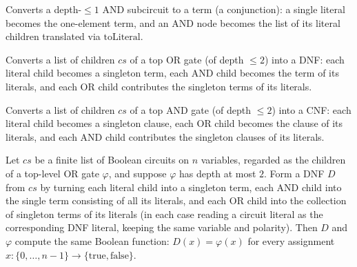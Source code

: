 \begin{definition}
\label{LMN.depth1AndToTerm}
\leanok
{}
Converts a depth-$\le 1$ AND subcircuit to a term (a conjunction): a single literal becomes
the one-element term, and an AND node becomes the list of its literal children translated
via $\mathrm{toLiteral}$.
\end{definition}

\begin{definition}
\label{LMN.depth2OrToDNF}
\leanok
{}
Converts a list of children $cs$ of a top OR gate (of depth $\le 2$) into a DNF: each literal
child becomes a singleton term, each AND child becomes the term of its literals, and each OR
child contributes the singleton terms of its literals.
\end{definition}

\begin{definition}
\label{LMN.depth2AndToCNF}
\leanok
{}
Converts a list of children $cs$ of a top AND gate (of depth $\le 2$) into a CNF: each literal
child becomes a singleton clause, each OR child becomes the clause of its literals, and each
AND child contributes the singleton clauses of its literals.
\end{definition}

\begin{lemma}
\label{LMN.depth2OrToDNF_eval}
\leanok
{}
Let $cs$ be a finite list of Boolean circuits on $n$ variables, regarded as the children
of a top-level OR gate $\varphi$, and suppose $\varphi$ has depth at most $2$. Form a
DNF $D$ from $cs$ by turning each literal child into a singleton term, each AND child
into the single term consisting of all its literals, and each OR child into the
collection of singleton terms of its literals (in each case reading a circuit literal as
the corresponding DNF literal, keeping the same variable and polarity). Then $D$ and
$\varphi$ compute the same Boolean function: $D(x) = \varphi(x)$ for every assignment $x
\colon \{0,\dots,n-1\} \to \{\mathrm{true},\mathrm{false}\}$.
\end{lemma}

